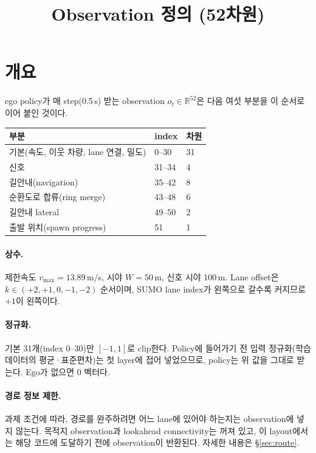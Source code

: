 \documentclass[10pt]{article}
\title{Observation 정의 (52차원)}
\date{}
\newcommand{\vmax}{v_{\max}}
\begin{document}
\maketitle

\section{개요}

ego policy가 매 step(0.5\,s) 받는 observation $o_t \in \mathbb{R}^{52}$은 다음 여섯 부분을 이 순서로 이어 붙인 것이다.

\begin{center}
\begin{tabular}{@{}lll@{}}
\toprule
부분 & index & 차원 \\
\midrule
기본(속도, 이웃 차량, lane 연결, 밀도) & 0--30 & 31 \\
신호 & 31--34 & 4 \\
길안내(navigation) & 35--42 & 8 \\
순환도로 합류(ring merge) & 43--48 & 6 \\
길안내 lateral & 49--50 & 2 \\
출발 위치(spawn progress) & 51 & 1 \\
\bottomrule
\end{tabular}
\end{center}

\paragraph{상수.} 제한속도 $\vmax = 13.89$\,m/s, 시야 $W = 50$\,m, 신호 시야 100\,m.
Lane offset은 $k \in (+2, +1, 0, -1, -2)$ 순서이며, SUMO lane index가 왼쪽으로 갈수록 커지므로 $+1$이 왼쪽이다.

\paragraph{정규화.} 기본 31개(index 0--30)만 $[-1, 1]$로 clip한다. Policy에 들어가기 전 입력 정규화(학습 데이터의 평균·표준편차)는 첫 layer에 접어 넣었으므로, policy는 위 값을 그대로 받는다. Ego가 없으면 0 벡터다.

\paragraph{경로 정보 제한.} 과제 조건에 따라, 경로를 완주하려면 어느 lane에 있어야 하는지는 observation에 넣지 않는다. 목적지 observation과 lookahead connectivity는 꺼져 있고, 이 layout에서는 해당 코드에 도달하기 전에 observation이 반환된다. 자세한 내용은 \S\ref{sec:route}.
\end{document}
